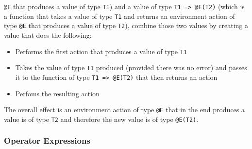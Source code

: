 \documentclass{article}
\begin{document}
\texttt{@E} that produces a value of type \texttt{T1}) and a value of type
\texttt{T1 => @E(T2)} (which is a function that takes a value of type \texttt{T1}
and returns an environment action of type \texttt{@E} that produces a value
of type \texttt{T2}), combine those two values by creating a value that does the
following: 
\begin{itemize}
\item
Performs the first action that produces a value of type \texttt{T1}

\item
Takes the value of type \texttt{T1} produced (provided there was no error) and
passes it to the function of type \texttt{T1 => @E(T2)} that then returns an
action

\item
Perfoms the resulting action 
\end{itemize}
The overall effect is an environment action  of type \texttt{@E} that in the end
produces a value is of type \texttt{T2} and therefore the new value is of type
\texttt{@E(T2)}.

\subsubsection{Operator Expressions}
\end{document}
